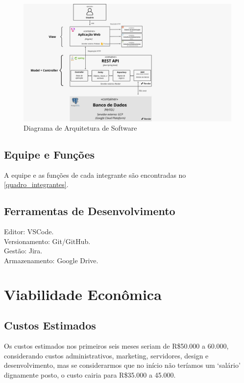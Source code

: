 \begin{figure}[h!]
    \centering
    \includegraphics[width=1.5\textwidth]{Figuras/diagrama_de_software.jpeg}
    \caption{Diagrama de Arquitetura de Software}
    \label{fig:fluxo-comunicacao}
\end{figure}


\subsection*{Equipe e Funções}
A equipe e as funções de cada integrante são encontradas no \autoref{quadro_integrantes}.


\subsection*{Ferramentas de Desenvolvimento}
Editor: VSCode. \\
Versionamento: Git/GitHub. \\
Gestão: Jira. \\
Armazenamento: Google Drive.


\section{Viabilidade Econômica}

\subsection*{Custos Estimados}
Os custos estimados nos primeiros seis meses seriam de R\$50.000 a 60.000, considerando custos administrativos, marketing, servidores, design e desenvolvimento, mas se considerarmos que no início não teríamos um ‘salário’ dignamente posto, o custo cairia para R\$35.000 a 45.000. 